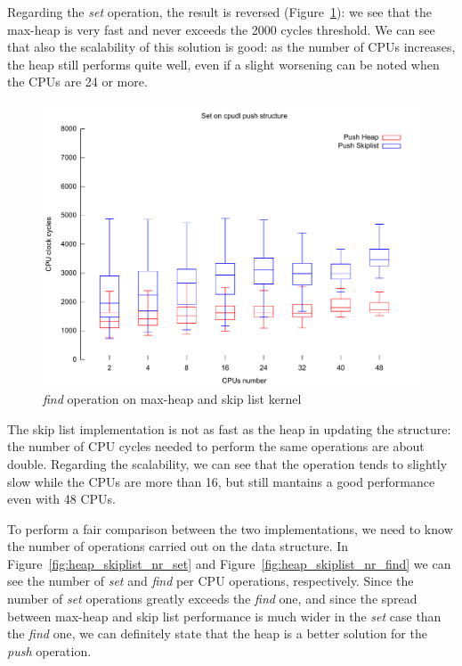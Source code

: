 Regarding the \emph{set} operation, the result is reversed 
(Figure~\ref{fig:heap_skiplist_set}): we
see that the max-heap is very fast and never exceeds the 2000 cycles threshold.
We can see that also the scalability of this solution is good: as the number of
CPUs increases, the heap still performs quite well, even if a slight worsening
can be noted when the CPUs are 24 or more.

\begin{figure}[htbp]
    \includegraphics[width=\columnwidth]{images/heap_skiplist_set.pdf}
    \caption{\emph{find} operation on max-heap and skip list kernel}
    \label{fig:heap_skiplist_set}
\end{figure}

The skip list implementation is not as fast as the heap in updating the
structure: the number of CPU cycles needed to perform the same operations are
about double. Regarding the scalability, we can see that the operation tends
to slightly slow while the CPUs are more than 16, but still mantains
a good performance even with 48 CPUs.

To perform a fair comparison between the two implementations, we need to know
the number of operations carried out on the data structure. 
In Figure~\ref{fig:heap_skiplist_nr_set} 
and Figure~\ref{fig:heap_skiplist_nr_find} we can see the number of \emph{set} 
and \emph{find} per CPU operations, respectively. Since the number of \emph{set} 
operations greatly exceeds the \emph{find}
one, and since the spread between max-heap and skip list performance is much
wider in the \emph{set} case than the \emph{find} one, we can definitely
state that the heap is a better solution for the \emph{push} operation.

